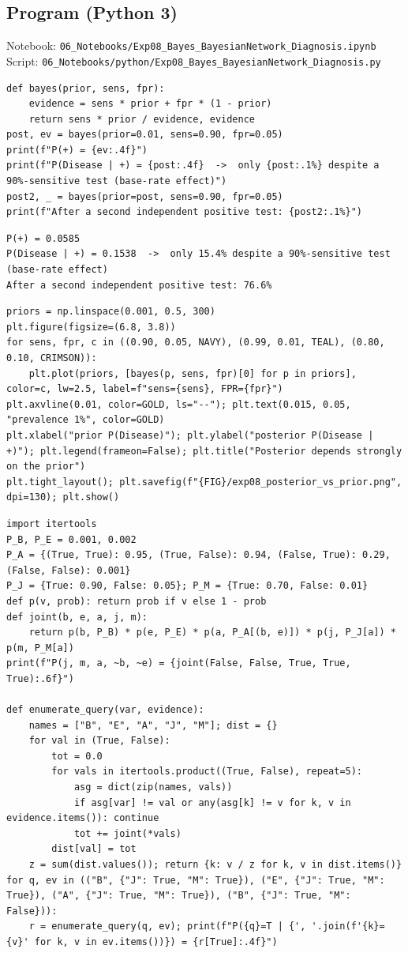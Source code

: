 \documentclass[11pt]{article}
\begin{document}
\subsection*{Program (Python 3)}
{\small\color{slate}Notebook: \texttt{06\_Notebooks/Exp08\_Bayes\_BayesianNetwork\_Diagnosis.ipynb}\\ Script: \texttt{06\_Notebooks/python/Exp08\_Bayes\_BayesianNetwork\_Diagnosis.py}}
\begin{lstlisting}[style=py]
def bayes(prior, sens, fpr):
    evidence = sens * prior + fpr * (1 - prior)
    return sens * prior / evidence, evidence
post, ev = bayes(prior=0.01, sens=0.90, fpr=0.05)
print(f"P(+) = {ev:.4f}")
print(f"P(Disease | +) = {post:.4f}  ->  only {post:.1%} despite a 90%-sensitive test (base-rate effect)")
post2, _ = bayes(prior=post, sens=0.90, fpr=0.05)
print(f"After a second independent positive test: {post2:.1%}")
\end{lstlisting}
\begin{lstlisting}[style=out]
P(+) = 0.0585
P(Disease | +) = 0.1538  ->  only 15.4% despite a 90%-sensitive test (base-rate effect)
After a second independent positive test: 76.6%
\end{lstlisting}
\begin{lstlisting}[style=py]
priors = np.linspace(0.001, 0.5, 300)
plt.figure(figsize=(6.8, 3.8))
for sens, fpr, c in ((0.90, 0.05, NAVY), (0.99, 0.01, TEAL), (0.80, 0.10, CRIMSON)):
    plt.plot(priors, [bayes(p, sens, fpr)[0] for p in priors], color=c, lw=2.5, label=f"sens={sens}, FPR={fpr}")
plt.axvline(0.01, color=GOLD, ls="--"); plt.text(0.015, 0.05, "prevalence 1%", color=GOLD)
plt.xlabel("prior P(Disease)"); plt.ylabel("posterior P(Disease | +)"); plt.legend(frameon=False); plt.title("Posterior depends strongly on the prior")
plt.tight_layout(); plt.savefig(f"{FIG}/exp08_posterior_vs_prior.png", dpi=130); plt.show()
\end{lstlisting}
\begin{lstlisting}[style=py]
import itertools
P_B, P_E = 0.001, 0.002
P_A = {(True, True): 0.95, (True, False): 0.94, (False, True): 0.29, (False, False): 0.001}
P_J = {True: 0.90, False: 0.05}; P_M = {True: 0.70, False: 0.01}
def p(v, prob): return prob if v else 1 - prob
def joint(b, e, a, j, m):
    return p(b, P_B) * p(e, P_E) * p(a, P_A[(b, e)]) * p(j, P_J[a]) * p(m, P_M[a])
print(f"P(j, m, a, ~b, ~e) = {joint(False, False, True, True, True):.6f}")

def enumerate_query(var, evidence):
    names = ["B", "E", "A", "J", "M"]; dist = {}
    for val in (True, False):
        tot = 0.0
        for vals in itertools.product((True, False), repeat=5):
            asg = dict(zip(names, vals))
            if asg[var] != val or any(asg[k] != v for k, v in evidence.items()): continue
            tot += joint(*vals)
        dist[val] = tot
    z = sum(dist.values()); return {k: v / z for k, v in dist.items()}
for q, ev in (("B", {"J": True, "M": True}), ("E", {"J": True, "M": True}), ("A", {"J": True, "M": True}), ("B", {"J": True, "M": False})):
    r = enumerate_query(q, ev); print(f"P({q}=T | {', '.join(f'{k}={v}' for k, v in ev.items())}) = {r[True]:.4f}")
\end{lstlisting}
\end{document}
